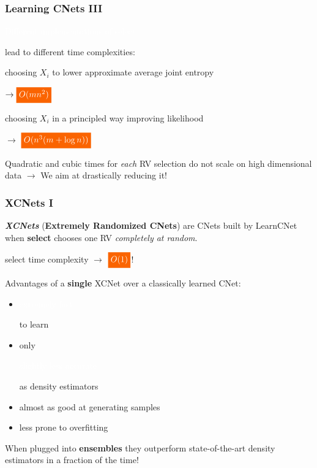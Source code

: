 \documentclass[xcolor={usenames,dvipsnames,svgnames}, compress]{beamer}
\newcommand{\highlight}[2][yellow]{\mathchoice%
  {\colorbox{#1}{\strut\textcolor{white}{$\displaystyle{#2}$}}}%
  {\colorbox{#1}{\strut\textcolor{white}{$\textstyle{#2}$}}}%
  {\colorbox{#1}{\strut\textcolor{white}{$\scriptstyle{#2}$}}}%
  {\colorbox{#1}{\strut\textcolor{white}{$\scriptscriptstyle{#2}$}}}}%
\newcommand{\highlighttext}[2][yellow]{{\colorbox{#1}{\strut\textcolor{white}{#2}}}}
\begin{document}
\begin{frame}[t]
  \frametitle{Learning CNets III}
  \small

  \highlighttext[gold4]{Different implementations of \textsf{select}}
  lead to different time complexities:
  \begin{center}
      \begin{minipage}{0.9\linewidth}
        \begin{description}[align=parright]
        \item[\textbf{\textsf{entCNet}}] choosing
          $X_{i}$ to lower approximate average joint entropy~\parencite{Rahman2014}\par
          {\hfill $\rightarrow\highlight[gold4]{O(mn^2)}$}
        \item[\textbf{\textsf{dCSN}}] choosing
          $X_{i}$ in a principled way improving likelihood~\parencite{DiMauro2015a}\par
          {\hfill $\rightarrow$ $\highlight[gold4]{O(n^3(m + \log n))}$}
        \end{description}
      \end{minipage}
    \end{center}

  \vspace{10pt}
  Quadratic and cubic times for \emph{each} RV selection do not scale
  on high dimensional data \hspace{80pt}$\rightarrow$
  We aim at drastically reducing it!
\end{frame}

\begin{frame}[t]
  \frametitle{XCNets I}
\small
  \emph{\textbf{XCNets}} (\textbf{Extremely Randomized CNets}) are CNets built by \textsf{LearnCNet} when
    \textsf{\textbf{select}} chooses one RV \emph{completely at random}.\par
    {\hfill\textsf{select} time complexity $\rightarrow$ $\highlight[gold4]{O(1)}$!}
    \vspace{20pt}

    Advantages of a \textbf{single} XCNet over a classically learned CNet:
    \begin{itemize}
      \setlength{\itemsep}{-3pt}
      \item \highlighttext[gold4]{extremely fast} to learn
    \item only \highlighttext[lacamlilac]{slightly less accurate} as density estimators
    \item almost as good at generating samples
    \item less prone to overfitting
    \end{itemize}
\vspace{20pt}

When plugged into \textbf{ensembles} they outperform state-of-the-art
density estimators in a fraction of the time!
\end{frame}
\end{document}
